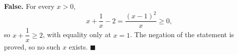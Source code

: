 \textbf{False.} For every $x>0$,
\[x+\dfrac1x-2=\dfrac{(x-1)^2}{x}\ge0,\]
so $x+\dfrac1x\ge2$, with equality only at $x=1$. The negation of the statement is proved, so no such $x$ exists. $\blacksquare$
